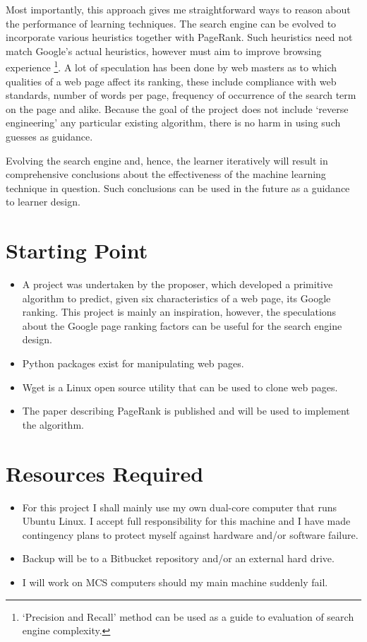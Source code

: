 Most importantly, this approach gives me straightforward ways to reason about the performance of learning techniques. The search engine can be evolved to incorporate various heuristics together with PageRank. Such heuristics need not match Google's actual heuristics, however must aim to improve browsing experience \footnote{`Precision and Recall' method can be used as a guide to evaluation of search engine complexity.}. A lot of speculation has been done by web masters as to which qualities of a web page affect its ranking, these include compliance with web standards, number of words per page, frequency of occurrence of the search term on the page and alike. Because the goal of the project does not include `reverse engineering' any particular existing algorithm, there is no harm in using such guesses as guidance. 

Evolving the search engine and, hence, the learner iteratively will result in comprehensive conclusions about the effectiveness of the machine learning technique in question. Such conclusions can be used in the future as a guidance to learner design. 

\section*{\bf Starting Point}

\begin{itemize}
\item A project\cite{reid} was undertaken by the proposer, which developed a primitive algorithm to predict, given six characteristics of a web page, its Google ranking.  This project is mainly an inspiration, however, the speculations about the Google page ranking factors can be useful for the search engine design. 
\item Python packages exist for manipulating web pages.
\item Wget is a Linux open source utility that can be used to clone web pages.
\item The paper describing PageRank is published and will be used to implement the algorithm.
\end{itemize}


\section*{\bf Resources Required}
\begin{itemize}
\item For this project I shall mainly use my own dual-core computer that runs Ubuntu Linux. I accept full responsibility for this machine and I have made contingency plans to protect myself against hardware and/or software failure.
\item Backup will be to a Bitbucket repository and/or an external hard drive.
\item I will work on MCS computers should my main machine suddenly fail. 
\end{itemize}
